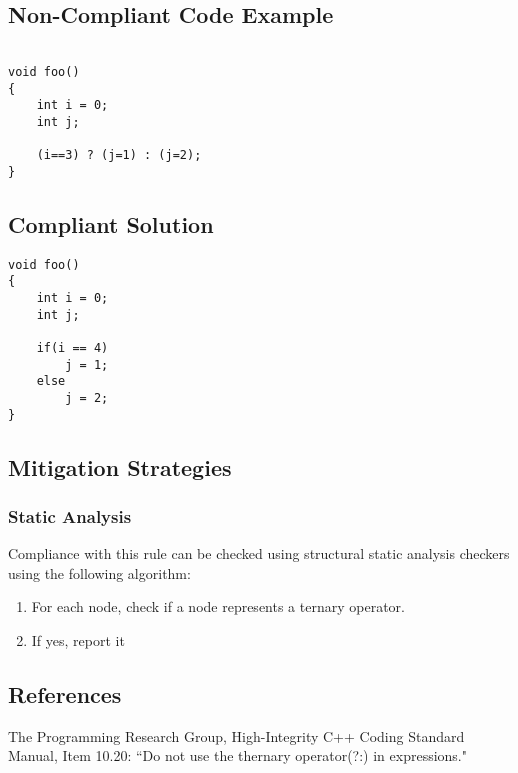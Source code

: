 \subsection{Non-Compliant Code Example}


\begin{verbatim}

void foo()
{
	int i = 0;
	int j;

	(i==3) ? (j=1) : (j=2);
}
\end{verbatim}

\subsection{Compliant Solution}


\begin{verbatim}
void foo()
{
	int i = 0;
	int j;

	if(i == 4)
		j = 1;
	else
		j = 2;
}
\end{verbatim}

\subsection{Mitigation Strategies}
\subsubsection{Static Analysis} 

Compliance with this rule can be checked using structural static analysis checkers using the following algorithm:

\begin{enumerate}
\item For each node, check if a node represents a ternary operator.
\item If yes, report it
\end{enumerate}

\subsection{References}


The Programming Research Group, High-Integrity C++ Coding Standard Manual, Item 10.20: ``Do not use the thernary operator(?:) in expressions."
